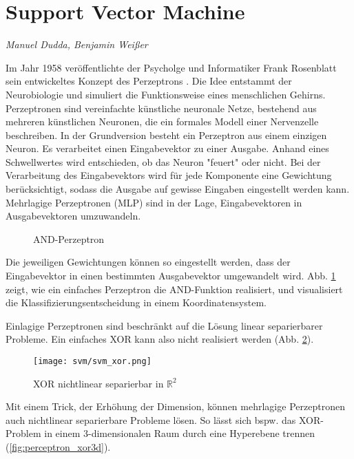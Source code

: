 \section{Support Vector Machine}
\label{mainsec:svm}
\textit{Manuel Dudda, Benjamin Weißer}

Im Jahr 1958 veröffentlichte der Psycholge und Informatiker Frank Rosenblatt sein entwickeltes Konzept des Perzeptrons \cite{rosenblatt58a}. 
Die Idee entstammt der Neurobiologie und simuliert die Funktionsweise eines menschlichen Gehirns. 
Perzeptronen sind vereinfachte künstliche neuronale Netze, bestehend aus mehreren künstlichen Neuronen, die ein formales Modell einer Nervenzelle beschreiben. 
In der Grundversion besteht ein Perzeptron aus einem einzigen Neuron. 
Es verarbeitet einen Eingabevektor zu einer Ausgabe. 
Anhand eines Schwellwertes wird entschieden, ob das Neuron "{}feuert"{} oder nicht. 
Bei der Verarbeitung des Eingabevektors wird für jede Komponente eine Gewichtung berücksichtigt, sodass die Ausgabe auf gewisse Eingaben eingestellt werden kann. 
Mehrlagige Perzeptronen (\ac{MLP}) sind in der Lage, Eingabevektoren in Ausgabevektoren umzuwandeln. 

\begin{figure}[htbp] \centering
    \caption{AND-Perzeptron}
    \label{fig:perceptron_and}
\end{figure}

Die jeweiligen Gewichtungen können so eingestellt werden, dass der Eingabevektor in einen bestimmten Ausgabevektor umgewandelt wird. 
Abb. \ref{fig:perceptron_and} zeigt, wie ein einfaches Perzeptron die AND-Funktion realisiert, und visualisiert die Klassifizierungsentscheidung in einem Koordinatensystem. 

Einlagige Perzeptronen sind beschränkt auf die Lösung linear separierbarer Probleme. 
Ein einfaches XOR kann also nicht realisiert werden (Abb. \ref{fig:perceptron_xor}). 

\begin{figure}[htbp] \centering
    \texttt{[image: svm/svm\_xor.png]}
    \caption{XOR nichtlinear separierbar in $\mathbb{R}^2$}
    \label{fig:perceptron_xor}
\end{figure}

Mit einem Trick, der Erhöhung der Dimension, können mehrlagige Perzeptronen auch nichtlinear separierbare Probleme lösen. 
So lässt sich bspw. das XOR-Problem in einem 3-dimensionalen Raum durch eine Hyperebene trennen (\ref{fig:perceptron_xor3d}).

